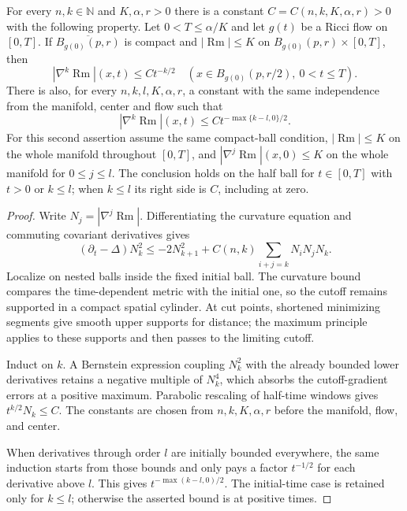 \begin{theorem}\label{thm:rf-shi}
For every $n,k\in\mathbb N$ and $K,\alpha,r>0$ there is a constant
$C=C(n,k,K,\alpha,r)>0$ with the following property.  Let $0<T\leq\alpha/K$
and let $g(t)$ be a Ricci flow on $[0,T]$.  If
$\overline{B_{g(0)}(p,r)}$ is compact and $|\operatorname{Rm}|\leq K$ on
$B_{g(0)}(p,r)\times[0,T]$, then
\[
 |\nabla^k\operatorname{Rm}|(x,t)\leq C t^{-k/2}
 \quad (x\in B_{g(0)}(p,r/2),\ 0<t\leq T).
\]
There is also, for every $n,k,l,K,\alpha,r$, a constant with the same
independence from the manifold, center and flow such that
\[
 |\nabla^k\operatorname{Rm}|(x,t)
       \leq C t^{-\max\{k-l,0\}/2}.
\]
For this second assertion assume the same compact-ball condition,
$|\operatorname{Rm}|\leq K$ on the whole manifold throughout $[0,T]$,
and $|\nabla^j\operatorname{Rm}|(x,0)\leq K$ on the whole manifold for
$0\leq j\leq l$.  The conclusion holds on the half ball for
$t\in[0,T]$ with $t>0$ or $k\leq l$; when $k\leq l$ its right side is $C$,
including at zero.
\end{theorem}

\begin{proof}
Write $N_j=|\nabla^j\operatorname{Rm}|$. Differentiating the
curvature equation and commuting covariant derivatives gives
\[
 (\partial_t-\Delta)N_k^2
 \leq-2N_{k+1}^2+
 C(n,k)\sum_{i+j=k}N_iN_jN_k.
\]
Localize on nested balls inside the fixed initial ball. The
curvature bound compares the time-dependent metric with the initial
one, so the cutoff remains supported in a compact spatial cylinder.
At cut points, shortened minimizing segments give smooth upper
supports for distance; the maximum principle applies to these
supports and then passes to the limiting cutoff.

Induct on $k$. A Bernstein expression coupling $N_k^2$ with the
already bounded lower derivatives retains a negative multiple of
$N_k^4$, which absorbs the cutoff-gradient errors at a positive
maximum. Parabolic rescaling of half-time windows gives
$t^{k/2}N_k\leq C$. The constants are chosen from
$n,k,K,\alpha,r$ before the manifold, flow, and center.

When derivatives through order $l$ are initially bounded everywhere,
the same induction starts from those bounds and only pays a factor
$t^{-1/2}$ for each derivative above $l$. This gives
$t^{-\max(k-l,0)/2}$. The initial-time case is retained only for
$k\leq l$; otherwise the asserted bound is at positive times.
\end{proof}

